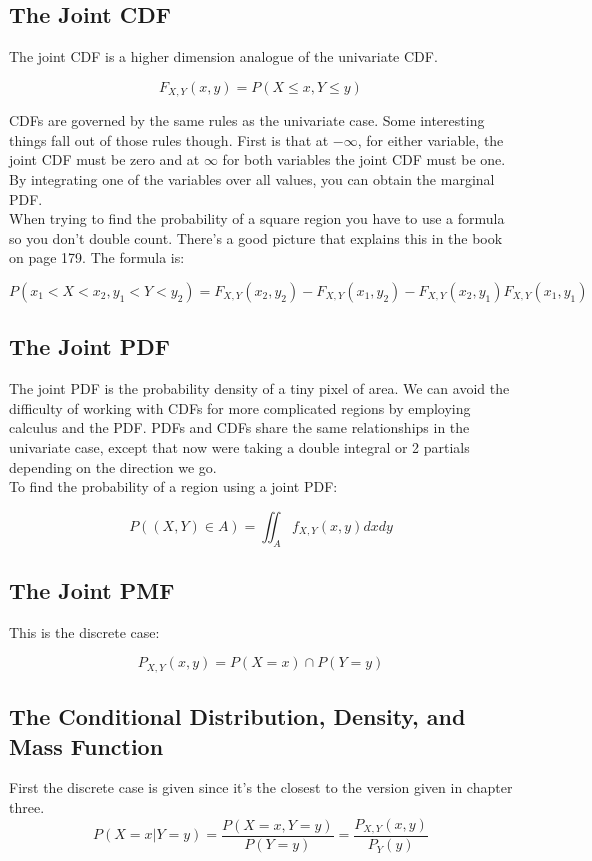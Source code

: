 \documentclass[12pt]{article}
\begin{document}
\subsection{The Joint CDF}
The joint CDF is a higher dimension analogue of the univariate CDF.

\[F_{X,Y}(x,y) = P(X\leq x, Y\leq y)\]

CDFs are governed by the same rules as the univariate case. Some
interesting things fall out of those rules though. First is that 
at $-\infty$, for either variable, the joint CDF must be zero and at
$\infty$ for both variables the joint CDF must be one. By integrating
one of the variables over all values, you can obtain the marginal
PDF.\\

When trying to find the probability of a square region you have to
use a formula so you don't double count. There's a good picture
that explains this in the book on page 179. The formula is:

\[P(x_1 < X < x_2,y_1 < Y < y_2) = F_{X,Y}(x_2,y_2)-
F_{X,Y}(x_1,y_2)-F_{X,Y}(x_2,y_1)F_{X,Y}(x_1,y_1)\]

\subsection{The Joint PDF}
The joint PDF is the probability density of a tiny pixel of area.
We can avoid the difficulty of working with CDFs for more complicated
regions by employing calculus and the PDF. PDFs and CDFs share the
same relationships in the univariate case, except that now
were taking a double integral or 2 partials depending on the 
direction we go. \\

To find the probability of a region using a joint PDF:

\[P((X,Y)\in A) = \iint_A f_{X,Y}(x,y)dxdy\]

\subsection{The Joint PMF}
This is the discrete case:

\[P_{X,Y}(x,y) = P(X=x) \cap P(Y=y)\]

\subsection{The Conditional Distribution, Density, and Mass Function}
First the discrete case is given since it's the closest to the
version given in chapter three.
\[P(X=x|Y=y) = \frac{P(X=x,Y=y)}{P(Y=y)} = \frac{P_{X,Y}(x,y)}{P_Y(y)}\]
\end{document}
